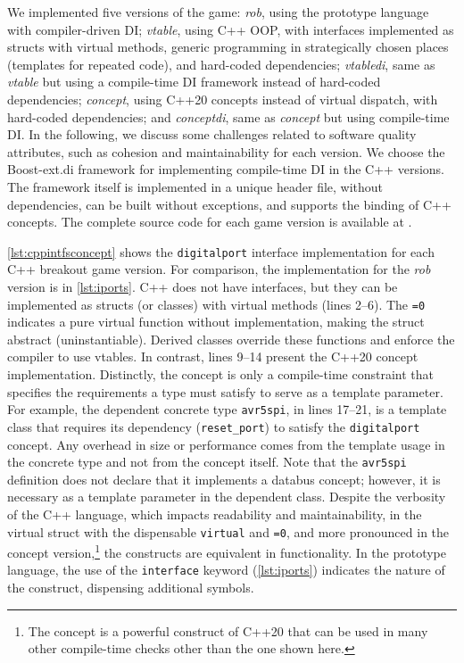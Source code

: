 \documentclass[10pt,sigplan,screen,anonymous]{acmart}
\newcommand{\blindreview}[1]{{\color{teal}{<omitted for blind review>}}}
\begin{document}
We implemented five versions of the game: \emph{rob}, using the prototype language with compiler-driven DI; \emph{vtable}, using C++ OOP, with interfaces implemented as structs with virtual methods, generic programming in strategically chosen places (templates for repeated code), and hard-coded dependencies; \emph{vtabledi}, same as \emph{vtable} but using a compile-time DI framework \cite{boostdi2018} instead of hard-coded dependencies; \emph{concept}, using C++20 concepts instead of virtual dispatch, with hard-coded dependencies; and \emph{conceptdi}, same as \emph{concept} but using compile-time DI. In the following, we discuss some challenges related to software quality attributes, such as cohesion and maintainability for each version. We choose the Boost-ext.di framework \cite{boostdi2018} for implementing compile-time DI in the C++ versions. The framework itself is implemented in a unique header file, without dependencies, can be built without exceptions, and supports the binding of C++ concepts. The complete source code for each game version is available at \blindreview{\url{https://github.com/thborges/sblp2025}}.


\autoref{lst:cppintfsconcept} shows the {\tt digitalport} interface implementation for each C++ breakout game version. For comparison, the implementation for the \emph{rob} version is in \autoref{lst:iports}. C++ does not have interfaces, but they can be implemented as structs (or classes) with virtual methods (lines 2--6). The {\tt =0} indicates a pure virtual function without implementation, making the struct abstract (uninstantiable). Derived classes override these functions and enforce the compiler to use vtables. In contrast, lines 9--14 present the C++20 concept implementation. Distinctly, the concept is only a compile-time constraint that specifies the requirements a type must satisfy to serve as a template parameter. For example, the dependent concrete type {\tt avr5spi}, in lines 17--21, is a template class that requires its dependency ({\tt reset\_port}) to satisfy the {\tt digitalport} concept. Any overhead in size or performance comes from the template usage in the concrete type and not from the concept itself. Note that the {\tt avr5spi} definition does not declare that it implements a databus concept; however, it is necessary as a template parameter in the dependent class. Despite the verbosity of the C++ language, which impacts readability and maintainability, in the virtual struct with the dispensable {\tt virtual} and {\tt =0}, and more pronounced in the concept version,\footnote{The concept is a powerful construct of C++20 that can be used in many other compile-time checks other than the one shown here.} the constructs are equivalent in functionality. In the prototype language, the use of the {\tt interface} keyword (\autoref{lst:iports}) indicates the nature of the construct, dispensing additional symbols.
\end{document}
